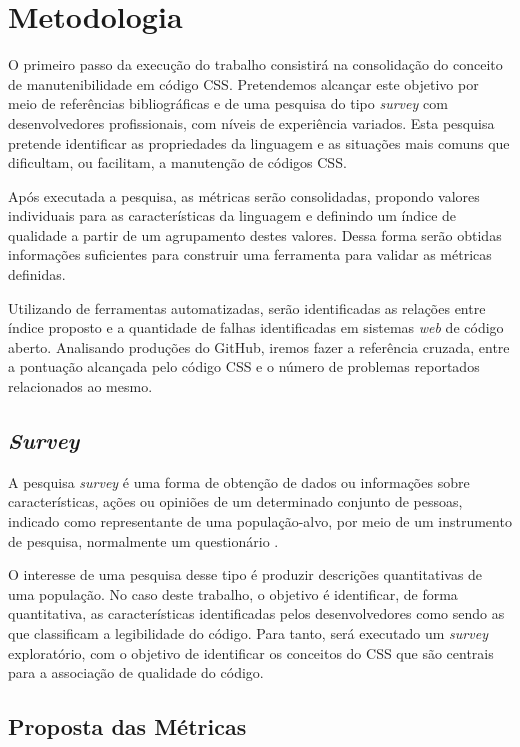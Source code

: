 %
%

\chapter{Metodologia}

O primeiro passo da execução do trabalho consistirá na consolidação do conceito de manutenibilidade em código CSS. Pretendemos alcançar este objetivo por meio de referências bibliográficas e de uma pesquisa do tipo \textit{survey} com desenvolvedores profissionais, com níveis de experiência variados. Esta pesquisa pretende identificar as propriedades da linguagem e as situações mais comuns que dificultam, ou facilitam, a manutenção de códigos CSS.

Após executada a pesquisa, as métricas serão consolidadas, propondo valores individuais para as características da linguagem e definindo um índice de qualidade a partir de um agrupamento destes valores. Dessa forma serão obtidas informações suficientes para construir uma ferramenta para validar as métricas definidas.

Utilizando de ferramentas automatizadas, serão identificadas as relações entre índice proposto e a quantidade de falhas identificadas em sistemas \textit{web} de código aberto. Analisando produções do GitHub, iremos fazer a referência cruzada, entre a pontuação alcançada pelo código CSS e o número de problemas reportados relacionados ao mesmo.

\section{\textit{Survey}}

A pesquisa \textit{survey} é uma forma de obtenção de dados ou informações sobre características, ações ou opiniões de um determinado conjunto de pessoas, indicado como representante de uma população-alvo, por meio de um instrumento de pesquisa, normalmente um questionário \cite{Freitas2000}. 

O interesse de uma pesquisa desse tipo é produzir descrições quantitativas de uma população. No caso deste trabalho, o objetivo é identificar, de forma quantitativa, as características identificadas pelos desenvolvedores como sendo as que classificam a legibilidade do código. Para tanto, será executado um \textit{survey} exploratório, com o objetivo de identificar os conceitos do CSS que são centrais para a associação de qualidade do código.

\section{Proposta das Métricas}

